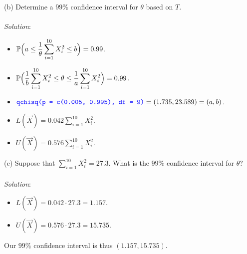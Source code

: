 \documentclass[12pt]{article}
\newcommand{\XBB}{\color{blue}}
\newcommand{\ds}{\displaystyle}
\begin{document}
(b) Determine a $ 99\% $ confidence interval for $ \theta $ based on $ T $. \\
\vspace{2.5mm} \\
\textit{Solution}:
\vspace{2.5mm} \\

\begin{itemize}
    \item $ \ds \mathbb{P} \Bigl( a \le \frac{1}{\theta} \sum_{i=1}^{10} X_{i}^{2} \le b \Bigr) = 0.99 $. \\
    \item $ \ds \mathbb{P} \Bigl( \frac{1}{b} \sum_{i=1}^{10} X_{i}^{2} \le \theta \le \frac{1}{a} \sum_{i=1}^{10} X_{i}^{2} \Bigr) = 0.99 $. \\
    \item $ \ds {\XBB \texttt{qchisq(p = c(0.005, 0.995), df = 9)}} = (1.735, 23.589) = (a, b) $.
    \item $ \ds L(\overrightarrow{X}) = 0.042 \sum_{i=1}^{10} X_{i}^{2} $. \\
    \item $ \ds U(\overrightarrow{X}) = 0.576 \sum_{i=1}^{10} X_{i}^{2} $. \\
\end{itemize}

\vspace{2.5mm}

(c) Suppose that $ \ds \sum_{i=1}^{10} X_{i}^{2} = 27.3 $.
What is the $ 99\% $ confidence interval for $ \theta $? \\
\vspace{2.5mm} \\
\textit{Solution}:
\vspace{2.5mm} \\

\begin{itemize}
    \item $ \ds L(\overrightarrow{X}) = 0.042 \cdot 27.3 = 1.157 $. \\
    \item $ \ds U(\overrightarrow{X}) = 0.576 \cdot 27.3 = 15.735 $. \\
\end{itemize}

\noindent
Our $ 99\% $ confidence interval is thus $ (1.157, 15.735) $. \\
\end{document}
